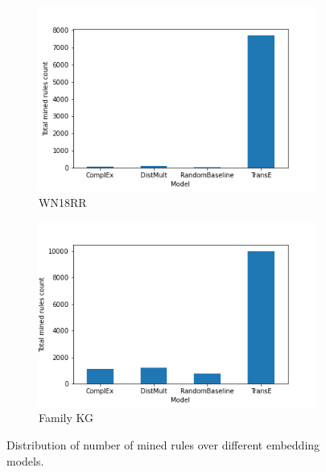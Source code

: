 \begin{figure}[htbp]
\centering
\begin{subfigure}{.5\textwidth}
  \centering
  \includegraphics[width=1\linewidth]{figures/results/Total_mined_rules-model-wn18rr.png}
  \caption{WN18RR}
  \label{fig:sub1}
\end{subfigure}%
\begin{subfigure}{.5\textwidth}
  \centering
  \includegraphics[width=1\linewidth]{figures/results/Total_mined_rules-model-family.png}
  \caption{Family KG}
  \label{fig:sub2}
\end{subfigure}
\caption[Number of mined rules over embedding models]{Distribution of number of mined rules over different embedding models.}
\label{fig:test}
\end{figure}

